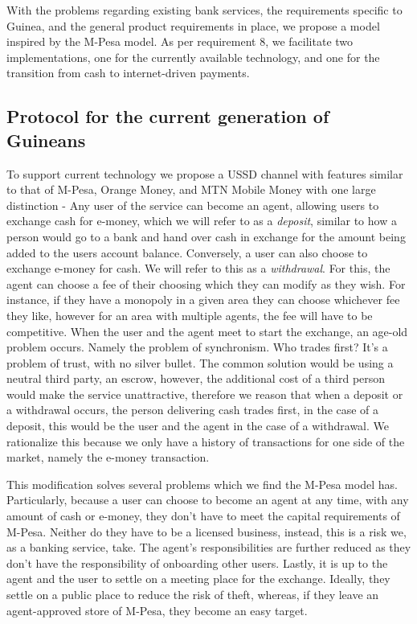 \documentclass[11pt, a4paper]{article}
\begin{document}
With the problems regarding existing bank services, the requirements specific to Guinea, and the general product requirements in place, we propose a model inspired by the M-Pesa model. As per requirement 8, we facilitate two implementations, one for the currently available technology, and one for the transition from cash to internet-driven payments.

\subsection{Protocol for the current generation of Guineans}
To support current technology we propose a USSD channel with features similar to that of M-Pesa, Orange Money, and MTN Mobile Money with one large distinction - Any user of the service can become an agent, allowing users to exchange cash for e-money, which we will refer to as a \textit{deposit}, similar to how a person would go to a bank and hand over cash in exchange for the amount being added to the users account balance. Conversely, a user can also choose to exchange e-money for cash. We will refer to this as a \textit{withdrawal}. For this, the agent can choose a fee of their choosing which they can modify as they wish. For instance, if they have a monopoly in a given area they can choose whichever fee they like, however for an area with multiple agents, the fee will have to be competitive. When the user and the agent meet to start the exchange, an age-old problem occurs. Namely the problem of synchronism. Who trades first? It's a problem of trust, with no silver bullet. The common solution would be using a neutral third party, an escrow, however, the additional cost of a third person would make the service unattractive, therefore we reason that when a deposit or a withdrawal occurs, the person delivering cash trades first, in the case of a deposit, this would be the user and the agent in the case of a withdrawal. We rationalize this because we only have a history of transactions for one side of the market, namely the e-money transaction.

This modification solves several problems which we find the M-Pesa model has. Particularly, because a user can choose to become an agent at any time, with any amount of cash or e-money, they don't have to meet the capital requirements of M-Pesa. Neither do they have to be a licensed business, instead, this is a risk we, as a banking service, take. The agent's responsibilities are further reduced as they don't have the responsibility of onboarding other users. Lastly, it is up to the agent and the user to settle on a meeting place for the exchange. Ideally, they settle on a public place to reduce the risk of theft, whereas, if they leave an agent-approved store of M-Pesa, they become an easy target.
\end{document}

